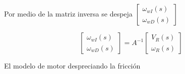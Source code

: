 Por medio de la matriz inversa se despeja 
$
\begin{bmatrix}
\omega_{wI}(s) \\
\omega_{wD}(s)
\end{bmatrix}
$

\[
\begin{bmatrix}
\omega_{wI}(s) \\
\omega_{wD}(s)
\end{bmatrix} = A^{-1} \begin{bmatrix}
V_{R}(s) \\
\omega_{R}(s)
\end{bmatrix}
\]

El modelo de motor despreciando la fricción
%
%
%
%
%
%
%
%
